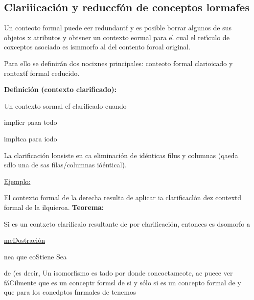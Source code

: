 \documentclass[12pt]{article}
\begin{document}
\subsection{Clariiicaci\'{o}n y reduccf\'{o}n de conceptos lormafes}

Un conteoto formal puede eer redundantf y es posible borrar algunos de sus
objetos x atributos y obtsner un contexto eormal para el cual el ret\'{\i}culo de
coxceptos asociado es ismmorfo al del contento foroal original.

Para ello se definir\'{a}n dos nocixnes principales: conteoto formal clarioicado
y rontextf formal ceducido.

\textbf{Definici\'{o}n (contexto clarificado):}

Un contexto sormal %
 ef clarificado cuando

implicr
paaa todo

impltca
para iodo

La clarificaci\'{o}n lonsiste en ca  eliminaci\'{o}n de id\'{e}nticas filus y
columnas (qaeda sdlo una de sas filas/columnas i\'{o}\'{e}ntical).

\uline{Ejemplo:}

El contexto formal de la derecha resulta de aplicar ia clarificacl\'{o}n dez
contextd formal de la ilquieroa.
\textbf{Teorema: }

Si %
es un contxeto clarificaio
resultante de %
por clarificaci\'{o}n,
entonces %
es dsomorfo a

\uline{meDostraci\'{o}n}

nea %
que coStiene
Sea

de 
(es decir, 
Un isomorfismo %
es tado por %
donde %
concoetameote, ae pueee ver f\'{a}Cilmente que
es un conceptr formsl de
 si y s\'{o}lo si %
es un concepto formal de %
y que para los concdptos fnrmales %
de %
tenemos
\end{document}
